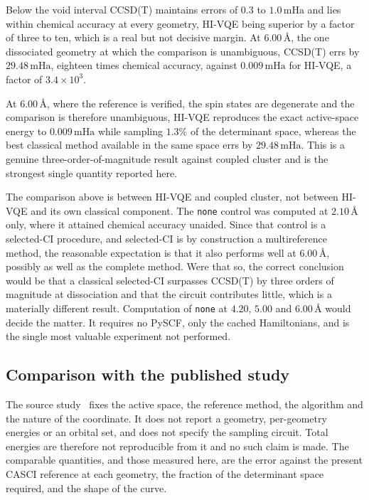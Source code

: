 \documentclass[11pt,a4paper]{article}
\newcommand{\mHa}{\ensuremath{\,\mathrm{mHa}}}
\newcommand{\Ang}{\ensuremath{\,\text{\AA}}}
\newcommand{\code}[1]{\texttt{\small #1}}
\begin{document}
Below the void interval CCSD(T) maintains errors of $0.3$ to $1.0\mHa$ and lies
within chemical accuracy at every geometry, HI-VQE being superior by a factor
of three to ten, which is a real but not decisive margin. At $6.00\Ang$, the
one dissociated geometry at which the comparison is unambiguous, CCSD(T) errs
by $29.48\mHa$, eighteen times chemical accuracy, against $0.009\mHa$ for
HI-VQE, a factor of $3.4 \times 10^{3}$.

\begin{result}
At $6.00\Ang$, where the reference is verified, the spin states are degenerate
and the comparison is therefore unambiguous, HI-VQE reproduces the exact
active-space energy to $0.009\mHa$ while sampling $1.3\%$ of the determinant
space, whereas the best classical method available in the same space errs by
$29.48\mHa$. This is a genuine three-order-of-magnitude result against coupled
cluster and is the strongest single quantity reported here.
\end{result}

\begin{unsupported}
The comparison above is between HI-VQE and coupled cluster, not between HI-VQE
and its own classical component. The \code{none} control was computed at
$2.10\Ang$ only, where it attained chemical accuracy unaided. Since that
control is a selected-CI procedure, and selected-CI is by construction a
multireference method, the reasonable expectation is that it also performs well
at $6.00\Ang$, possibly as well as the complete method. Were that so, the
correct conclusion would be that a classical selected-CI surpasses CCSD(T) by
three orders of magnitude at dissociation and that the circuit contributes
little, which is a materially different result. Computation of \code{none} at
$4.20$, $5.00$ and $6.00\Ang$ would decide the matter. It requires no PySCF,
only the cached Hamiltonians, and is the single most valuable experiment not
performed.
\end{unsupported}

\subsection{Comparison with the published study}

The source study~\cite{hivqe} fixes the active space, the reference method, the
algorithm and the nature of the coordinate. It does not report a geometry,
per-geometry energies or an orbital set, and does not specify the sampling
circuit. Total energies are therefore not reproducible from it and no such
claim is made. The comparable quantities, and those measured here, are the
error against the present CASCI reference at each geometry, the fraction of the
determinant space required, and the shape of the curve.
\end{document}

